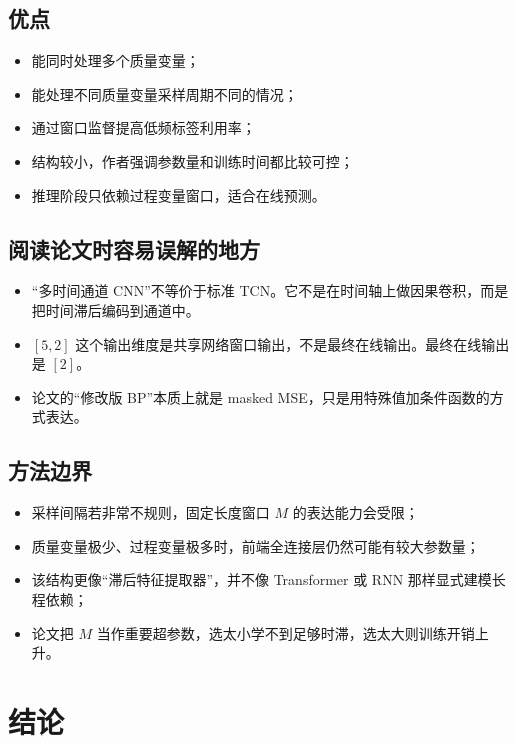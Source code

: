 \documentclass[UTF8]{ctexart}
\begin{document}
\subsection{优点}

\begin{itemize}
    \item 能同时处理多个质量变量；
    \item 能处理不同质量变量采样周期不同的情况；
    \item 通过窗口监督提高低频标签利用率；
    \item 结构较小，作者强调参数量和训练时间都比较可控；
    \item 推理阶段只依赖过程变量窗口，适合在线预测。
\end{itemize}

\subsection{阅读论文时容易误解的地方}

\begin{itemize}
    \item “多时间通道 CNN”不等价于标准 TCN。它不是在时间轴上做因果卷积，而是把时间滞后编码到通道中。
    \item $[5,2]$ 这个输出维度是共享网络窗口输出，不是最终在线输出。最终在线输出是 $[2]$。
    \item 论文的“修改版 BP”本质上就是 masked MSE，只是用特殊值加条件函数的方式表达。
\end{itemize}

\subsection{方法边界}

\begin{itemize}
    \item 采样间隔若非常不规则，固定长度窗口 $M$ 的表达能力会受限；
    \item 质量变量极少、过程变量极多时，前端全连接层仍然可能有较大参数量；
    \item 该结构更像“滞后特征提取器”，并不像 Transformer 或 RNN 那样显式建模长程依赖；
    \item 论文把 $M$ 当作重要超参数，选太小学不到足够时滞，选太大则训练开销上升。
\end{itemize}

\section{结论}
\end{document}
